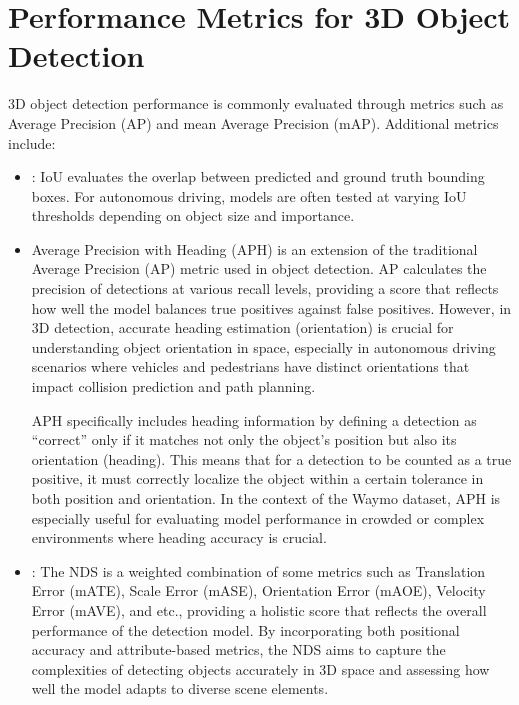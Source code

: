 \section{Performance Metrics for 3D Object Detection}
3D object detection performance is commonly evaluated through metrics 
such as Average Precision (AP) and mean Average Precision (mAP).
Additional metrics include:
\begin{itemize}
    \item {}: 
    IoU evaluates the overlap between predicted and ground truth bounding 
    boxes. For autonomous driving, models are often tested at varying IoU 
    thresholds depending on object size and importance.
    \item {}Average Precision with Heading (APH) is an extension of the traditional Average Precision (AP) metric used in object detection. AP calculates the precision of detections at various recall levels, providing a score that reflects how well the model balances true positives against false positives. However, in 3D detection, accurate heading estimation (orientation) is crucial for understanding object orientation in space, especially in autonomous driving scenarios where vehicles and pedestrians have distinct orientations that impact collision prediction and path planning.
    
    APH specifically includes heading information by defining a detection as “correct” only if it matches not only the object’s position but also its orientation (heading). This means that for a detection to be counted as a true positive, it must correctly localize the object within a certain tolerance in both position and orientation. In the context of the Waymo dataset, APH is especially useful for evaluating model performance in crowded or complex environments where heading accuracy is crucial.

    \item {} : 
    The NDS is a weighted combination of some metrics such as Translation Error (mATE), Scale Error (mASE), Orientation Error (mAOE), Velocity Error (mAVE), and etc., providing a holistic score that reflects the overall performance of the detection model. By incorporating both positional accuracy and attribute-based metrics, the NDS aims to capture the complexities of detecting objects accurately in 3D space and assessing how well the model adapts to diverse scene elements.
\end{itemize}



